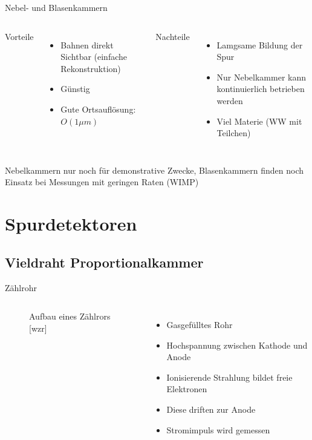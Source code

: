 \documentclass{beamer}
\begin{document}
\begin{frame}{Nebel- und Blasenkammern}
    \begin{columns}[T]
			Vorteile		
			\begin{itemize}
			  \item Bahnen direkt Sichtbar (einfache Rekonstruktion)
			  \item Günstig
			  \item Gute Ortsauflösung: $O(1 \mu m)$
			\end{itemize}	
	    	Nachteile
	    	\begin{itemize}
			  \item Lamgsame Bildung der Spur
			  \item Nur Nebelkammer kann kontinuierlich betrieben werden
			  \item Viel Materie (WW mit Teilchen)
			\end{itemize}
    \end{columns}
    \vspace{1cm}
    Nebelkammern nur noch für demonstrative Zwecke, Blasenkammern finden noch
    Einsatz bei Messungen mit geringen Raten (WIMP)
\end{frame}

\section{Spurdetektoren}


\subsection{Vieldraht Proportionalkammer}


\begin{frame}{Zählrohr}
    \begin{columns}[T]
    
			\begin{figure}[htbp]
			  \centering
			  
			  \caption{Aufbau eines Zählrors [wzr]}
			\end{figure}
			
	    	\begin{itemize}
	    	  \item Gasgefülltes Rohr
			  \item Hochspannung zwischen Kathode und Anode
			  \item Ionisierende Strahlung bildet freie Elektronen
			  \item Diese driften zur Anode	
			  \item Stromimpuls wird gemessen
			\end{itemize}
    \end{columns}
\end{frame}
\end{document}
